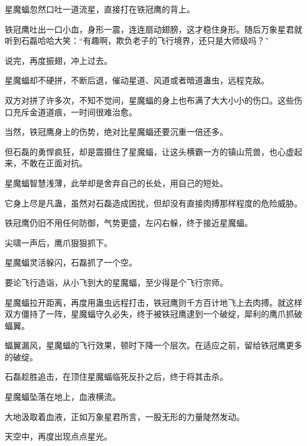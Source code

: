 \begin{this_body}
星魔蝠忽然口吐一道流星，直接打在铁冠鹰的背上。

铁冠鹰吐出一口小血，身形一震，连连扇动翅膀，这才稳住身形。随后万象星君就听到石磊哈哈大笑：“有趣啊，欺负老子的飞行境界，还只是大师级吗？”

说完，再度振翅，冲上过去。

星魔蝠却不硬拼，不断后退，催动星道、风道或者暗道蛊虫，远程克敌。

双方对拼了许多次，不知不觉间，星魔蝠的身上也布满了大大小小的伤口。这些伤口充斥金道道痕，一时间很难治愈。

当然，铁冠鹰身上的伤势，绝对比星魔蝠还要沉重一倍还多。

但石磊的勇悍疯狂，却是震摄住了星魔蝠，让这头横霸一方的镇山荒兽，也心虚起来，不敢在正面对抗。

星魔蝠智慧浅薄，此举却是舍弃自己的长处，用自己的短处。

它身上尽是凡蛊，虽然对石磊造成困扰，但却没有直接肉搏那样程度的危险威胁。

铁冠鹰仍旧不用任何防御，气势更盛，左闪右躲，终于接近星魔蝠。

尖啸一声后，鹰爪狠狠抓下。

星魔蝠灵活躲闪，石磊抓了一个空。

要论飞行造诣，从小飞到大的星魔蝠，至少得是个飞行宗师。

星魔蝠拉开距离，再度用蛊虫远程打击，铁冠鹰则千方百计地飞上去肉搏。就这样双方僵持了一阵，星魔蝠守久必失，终于被铁冠鹰逮到一个破绽，犀利的鹰爪抓破蝠翼。

蝠翼漏风，星魔蝠的飞行效果，顿时下降一个层次。在适应之前，留给铁冠鹰更多的破绽。

石磊趁胜追击，在顶住星魔蝠临死反扑之后，终于将其击杀。

星魔蝠坠落在地上，血液横流。

大地汲取着血液，正如万象星君所言，一股无形的力量陡然发动。

天空中，再度出现点点星光。

\end{this_body}

